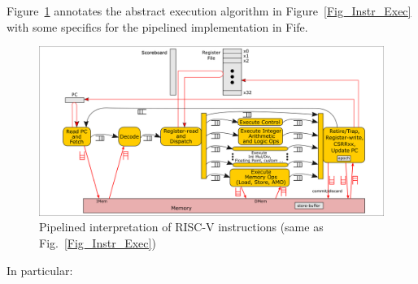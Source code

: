 Figure~\ref{Fig_Instr_Exec_w_FIFOs} annotates the abstract execution
algorithm in Figure~\ref{Fig_Instr_Exec} with some specifics for the
pipelined implementation in Fife.
\begin{figure}[htbp]
  \centerline{\includegraphics[width=6in,angle=0]{ch030_RISCV_Design_Space/Figures/Fig_Instr_Exec_w_FIFOs}}
  \caption{\label{Fig_Instr_Exec_w_FIFOs}Pipelined interpretation of RISC-V instructions (same as Fig.~\ref{Fig_Instr_Exec})}
\end{figure}
In particular:
